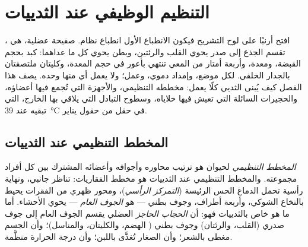 \chapter{التنظيم الوظيفي عند الثدييات}\label{ch:b1:mammal-organization}

افتح أرنبًا على لوح التشريح فيكون الانطباع الأول انطباع نظام. صفيحة
عضلية، هي ، تقسم الجذع إلى صدر يحوي القلب والرئتين،
وبطن يحوي كل ما عداهما: كبد بحجم القبضة، ومعدة، وأربعة أمتار من
المعي تنتهي بأعور في حجم المعدة، وكليتان ملتصقتان بالجدار الخلفي.
لكل  موضع، وإمداد دموي، وعمل؛ ولا يعمل أي منها وحده. يصف هذا
الفصل كيف يُبنى الثديي كلًا يعمل: مخططه التنظيمي، والأجهزة التي
تُجمع فيها أعضاؤه، والحجيرات السائلة التي تعيش فيها خلاياه، وسطوح
التبادل التي يلاقي بها الخارج،  التي تبقيه عند
\qty{39}{\celsius} في حقل من حقول يناير.

\section{المخطط التنظيمي عند الثدييات}

\begin{definition}\label{def:b1:mammal-organization:bodyplan}
\emph{المخطط التنظيمي} لحيوان هو ترتيب محاوره
وأجوافه وأعضائه المشترك بين كل أفراد مجموعته. والمخطط التنظيمي عند
الثدييات هو مخطط الفقاريات: تناظر جانبي، ونهاية رأسية تحمل الدماغ
 الحس الرئيسة (\emph{التمركز الرأسي})،
ومحور ظهري من الفقرات يحيط بالنخاع الشوكي، وأربعة أطراف، وجوف بطني
--- هو \emph{الجوف العام} --- يحوي الأحشاء. أما ما
هو خاص بالثدييات فهو: أن \emph{الحجاب الحاجز}
العضلي يقسم الجوف العام إلى جوف صدري (القلب، والرئتان) وجوف بطني
( الهضم، والكليتان، والمناسل)؛ وأن الجسم مغطى بالشعر؛ وأن
الصغار تُغذَّى باللبن؛ وأن درجة الحرارة منظَّمة.
\end{definition}

